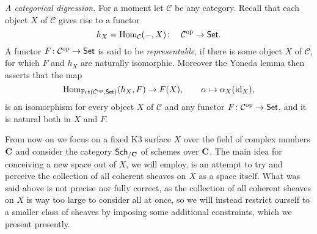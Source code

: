 
\vspace{0.3cm}
\noindent
\textsl{A categorical digression.}
For a moment let $\mathcal C$ be any category. Recall that each object $X$ of $\mathcal C$ gives rise to a functor 
\[
    h_X = \mathrm{Hom}_{\mathcal C}(-, X) \colon  \quad \mathcal C^{\text{op}} \to \mathsf{Set}.
\]
A functor $F \colon \mathcal C^{\text{op}} \to \mathsf{Set}$ is said to be \emph{representable}, if there is some object $X$ of $\mathcal C$, for which $F$ and $h_X$ are naturally isomorphic. Moreover the Yoneda lemma then asserts that the map  
\begin{equation}
    \label{eq: nat iso of Yoneda}
    \mathrm{Hom}_{\operatorname{Fct(\mathcal C^{\text{op}}, \mathsf{Set})}}(h_X, F) \to F(X), \qquad \alpha \mapsto \alpha_X(\operatorname{id}_{X}),
\end{equation}
is an isomorphism for every object $X$ of $\mathcal C$ and any functor $F \colon \mathcal C ^{\text{op}} \to \mathsf{Set}$, and it is natural both in $X$ and $F$.

\vspace{0.3cm}
\noindent
From now on we focus on a fixed K3 surface $X$ over the field of complex numbers $\mathbf C$ and consider the category $\mathsf{Sch}_{/\mathbf C}$ of schemes over $\mathbf C$. The main idea for conceiving a new space out of $X$, we will employ, is an attempt to try and perceive the collection of all coherent sheaves on $X$ as a space itself. What was said above is not precise nor fully correct, as the collection of all coherent sheaves on $X$ is way too large to consider all at once, so we will instead restrict ourself to a smaller class of sheaves by imposing some additional constraints, which we present presently. 

